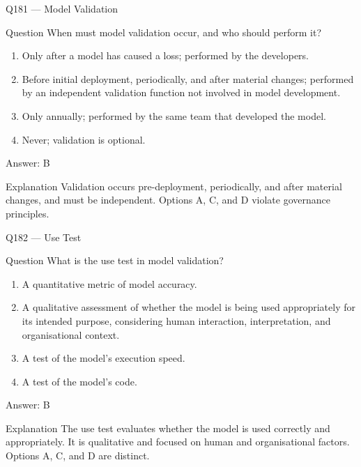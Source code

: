 \documentclass[aspectratio=169,8pt]{beamer}
\begin{document}
\begin{frame}{Q181 --- Model Validation}
\begin{block}{Question}
When must model validation occur, and who should perform it?
\begin{enumerate}
\item Only after a model has caused a loss; performed by the developers.
\item Before initial deployment, periodically, and after material changes; performed by an independent validation function not involved in model development.
\item Only annually; performed by the same team that developed the model.
\item Never; validation is optional.
\end{enumerate}  \end{block}
\begin{exampleblock}{Answer: B}\end{exampleblock}
\begin{block}{Explanation}
Validation occurs pre-deployment, periodically, and after material changes, and must be independent. Options A, C, and D violate governance principles.
\end{block}
\end{frame}

\begin{frame}{Q182 --- Use Test}
\begin{block}{Question}
What is the use test in model validation?
\begin{enumerate}
\item A quantitative metric of model accuracy.
\item A qualitative assessment of whether the model is being used appropriately for its intended purpose, considering human interaction, interpretation, and organisational context.
\item A test of the model's execution speed.
\item A test of the model's code.
\end{enumerate}  \end{block}
\begin{exampleblock}{Answer: B}\end{exampleblock}
\begin{block}{Explanation}
The use test evaluates whether the model is used correctly and appropriately. It is qualitative and focused on human and organisational factors. Options A, C, and D are distinct.
\end{block}
\end{frame}
\end{document}
